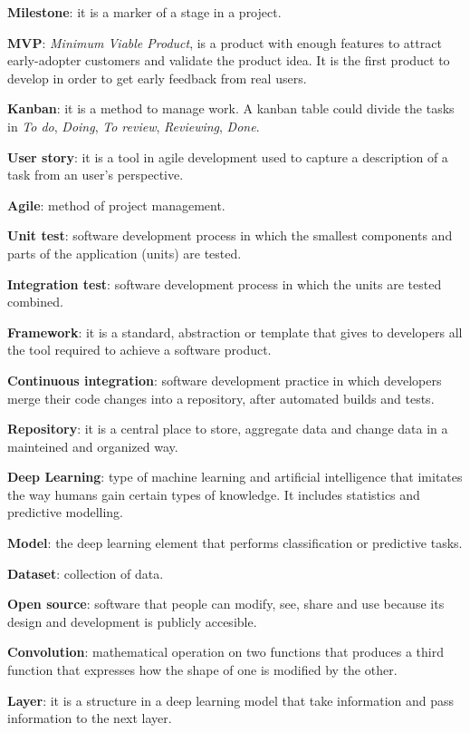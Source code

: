 \textbf{Milestone}: it is a marker of a stage in a project. 
\bigskip

\textbf{MVP}: \textit{Minimum Viable Product}, is a product with enough features to attract early-adopter customers and validate the product idea. It is the first product to develop in order to get early feedback from real users.
\bigskip

\textbf{Kanban}: it is a method to manage work. A kanban table could divide the tasks in \textit{To do}, \textit{Doing}, \textit{To review}, \textit{Reviewing}, \textit{Done}. 
\bigskip

\textbf{User story}: it is a tool in agile development used to capture a description of a task from an user's perspective.
\bigskip

\textbf{Agile}: method of project management.
\bigskip

\textbf{Unit test}: software development process in which the smallest components and parts of the application (units) are tested.
\bigskip

\textbf{Integration test}: software development process in which the units are tested combined.
\bigskip

\textbf{Framework}: it is a standard, abstraction or template that gives to developers all the tool required to achieve a software product.
\bigskip

\textbf{Continuous integration}: software development practice in which developers merge their code changes into a repository, after automated builds and tests.
\bigskip

\textbf{Repository}: it is a central place to store, aggregate data and change data in a mainteined and organized way.
\bigskip

\textbf{Deep Learning}: type of machine learning and artificial intelligence that imitates the way humans gain certain types of knowledge. It includes statistics and predictive modelling.
\bigskip

\textbf{Model}: the deep learning element that performs classification or predictive tasks. 
\bigskip

\textbf{Dataset}: collection of data.
\bigskip

\textbf{Open source}: software that people can modify, see, share and use because its design and development is publicly accesible.
\bigskip

\textbf{Convolution}: mathematical operation on two functions that produces a third function that expresses how the shape of one is modified by the other.
\bigskip

\textbf{Layer}: it is a structure in a deep learning model that take information and pass information to the next layer.
\bigskip